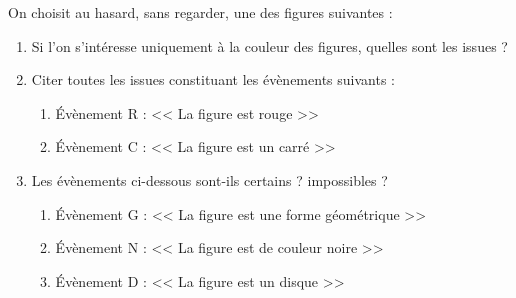 On choisit au hasard, sans regarder, une des figures suivantes :
\begin{center}
\end{center}

\begin{enumerate}
    \item Si l'on s'intéresse uniquement à la couleur des figures, quelles sont les issues ?
    \item Citer toutes les issues constituant les évènements suivants :
    \begin{enumerate}
        \item{Évènement R : << La figure est rouge >>}
        \item{Évènement C : << La figure est un carré >>}
    \end{enumerate}
    \item Les évènements ci-dessous sont-ils certains ? impossibles ?
    \begin{enumerate}
        \item{Évènement G : << La figure est une forme géométrique >>}
        \item{Évènement N : << La figure est de couleur noire >>}
        \item{Évènement D : << La figure est un disque >>}
    \end{enumerate}
\end{enumerate}